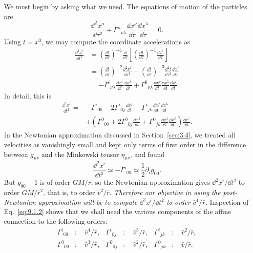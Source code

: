 We must begin by asking what we need. The equations of motion of the
particles are
\[
  \frac{\dd^2x^\mu}{\dd\tau^2}
  +\Gamma^\mu{}_{\nu\lambda}
   \frac{\dd x^\nu}{\dd\tau}\frac{\dd x^\lambda}{\dd\tau}=0.
\]
Using \(t=x^0\), we may compute the coordinate accelerations as
\[
  \begin{aligned}
  \frac{\dd^2x^i}{\dd t^2}
  &=
  \left(\frac{\dd t}{\dd\tau}\right)^{-1}
  \frac{\dd}{\dd\tau}
  \left[
    \left(\frac{\dd t}{\dd\tau}\right)^{-1}
    \frac{\dd x^i}{\dd\tau}
  \right]\\
  &=
  \left(\frac{\dd t}{\dd\tau}\right)^{-2}
  \frac{\dd^2x^i}{\dd\tau^2}
  -
  \left(\frac{\dd t}{\dd\tau}\right)^{-3}
  \frac{\dd^2t}{\dd\tau^2}\frac{\dd x^i}{\dd\tau}\\
  &=
  -\Gamma^i{}_{\nu\lambda}
   \frac{\dd x^\nu}{\dd t}\frac{\dd x^\lambda}{\dd t}
  +
  \Gamma^0{}_{\nu\lambda}
   \frac{\dd x^\nu}{\dd t}\frac{\dd x^\lambda}{\dd t}
   \frac{\dd x^i}{\dd t}.
  \end{aligned}
\]
In detail, this is
\begin{equation}
  \begin{split}
  \frac{\dd^2x^i}{\dd t^2}
  ={}&
  -\Gamma^i{}_{00}
  -2\Gamma^i{}_{0j}\frac{\dd x^j}{\dd t}
  -\Gamma^i{}_{jk}
   \frac{\dd x^j}{\dd t}\frac{\dd x^k}{\dd t}\\
  &+
  \left(
    \Gamma^0{}_{00}
    +2\Gamma^0{}_{0j}\frac{\dd x^j}{\dd t}
    +\Gamma^0{}_{jk}
     \frac{\dd x^j}{\dd t}\frac{\dd x^k}{\dd t}
  \right)\frac{\dd x^i}{\dd t}.
  \end{split}
  \tag{9.1.2}\label{eq:9.1.2}
\end{equation}
In the Newtonian approximation discussed in Section~\ref{sec:3.4}, we
treated all velocities as vanishingly small and kept only terms of first
order in the difference between \(g_{\mu\nu}\) and the Minkowski tensor
\(\eta_{\mu\nu}\), and found
\[
  \frac{\dd^2x^i}{\dd t^2}
  \simeq-\Gamma^i{}_{00}
  \simeq\frac12\partial_i g_{00}.
\]
But \(g_{00}+1\) is of order \(G\bar M/\bar r\), so the Newtonian
approximation gives \(\dd^2x^i/\dd t^2\) to order
\(G\bar M/\bar r^2\), that is, to order \(\bar v^2/\bar r\).
\emph{Therefore our objective in using the post-Newtonian approximation will
be to compute \(\dd^2x^i/\dd t^2\) to order \(\bar v^4/\bar r\).}
Inspection of Eq.~\eqref{eq:9.1.2} shows that we shall need the various
components of the affine connection to the following orders:
\begin{equation}
  \begin{aligned}
  \Gamma^i{}_{00}&:\quad \bar v^4/\bar r,&
  \Gamma^i{}_{0j}&:\quad \bar v^3/\bar r,&
  \Gamma^i{}_{jk}&:\quad \bar v^2/\bar r,\\
  \Gamma^0{}_{00}&:\quad \bar v^3/\bar r,&
  \Gamma^0{}_{0j}&:\quad \bar v^2/\bar r,&
  \Gamma^0{}_{jk}&:\quad \bar v/\bar r.
  \end{aligned}
  \tag{9.1.3}\label{eq:9.1.3}
\end{equation}

